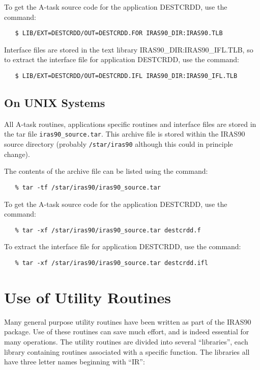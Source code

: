 To get the A-task source code for the application {\small DESTCRDD}, use the 
command:

\small
\begin{verbatim}
   $ LIB/EXT=DESTCRDD/OUT=DESTCRDD.FOR IRAS90_DIR:IRAS90.TLB
\end{verbatim}
\normalsize

Interface files are stored in the text library {\small
IRAS90\_DIR:IRAS90\_IFL.TLB}, so to extract the interface file for application
{\small DESTCRDD}, use the command: 

\small
\begin{verbatim}
   $ LIB/EXT=DESTCRDD/OUT=DESTCRDD.IFL IRAS90_DIR:IRAS90_IFL.TLB
\end{verbatim}
\normalsize

\subsection{On UNIX Systems}
All A-task routines, applications specific routines and interface files are
stored in the tar file \verb+iras90_source.tar+. This archive file is stored
within the {\small IRAS90} source directory (probably \verb+/star/iras90+
although this could in principle change). 

The contents of the archive file can be listed using the command: 

\small
\begin{verbatim}
   % tar -tf /star/iras90/iras90_source.tar
\end{verbatim}
\normalsize

To get the A-task
source code for the application {\small DESTCRDD}, use the command: 

\small
\begin{verbatim}
   % tar -xf /star/iras90/iras90_source.tar destcrdd.f 
\end{verbatim}
\normalsize

To extract the interface file for application {\small DESTCRDD}, use the
command: 

\small
\begin{verbatim}
   % tar -xf /star/iras90/iras90_source.tar destcrdd.ifl 
\end{verbatim}
\normalsize

\section{Use of Utility Routines}
\label{SEC:UTIL}
Many general purpose utility routines have been written as part of the {\small 
IRAS90} package. Use of these routines can save much effort, and is indeed 
essential for many operations. The utility routines are divided into several 
``libraries'', each library containing routines associated with a specific 
function. The libraries all have three letter names beginning with ``IR'':

